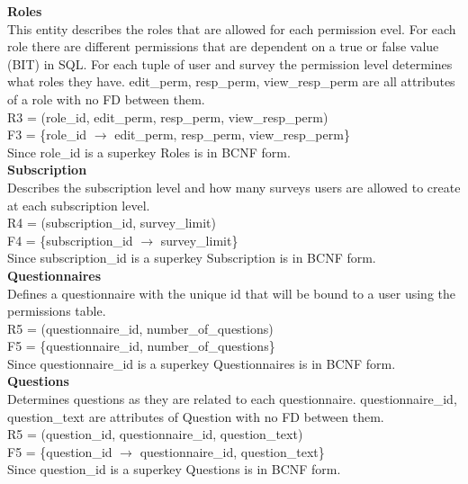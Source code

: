 \documentclass[12pt, oneside, a4paper]{article}
\newcommand{\tb}[1]{\textbf{#1}}
\begin{document}
    \tb{Roles} \\
    This entity describes the roles that are allowed for each permission evel. For each role there are different permissions that are dependent on a true or false value (BIT) in SQL. For each tuple of user and survey the permission level determines what roles they have. edit\_perm, resp\_perm, view\_resp\_perm are all attributes of a role with no FD between them. \\
    R3 = (role\_id, edit\_perm, resp\_perm, view\_resp\_perm) \\
    F3 = \{role\_id \(\rightarrow\) edit\_perm, resp\_perm, view\_resp\_perm\} \\
    Since role\_id is a superkey Roles is in BCNF form. 
    \\

    \tb{Subscription} \\
    Describes the subscription level and how many surveys users are allowed to create at each subscription level. \\
    R4 = (subscription\_id, survey\_limit) \\
    F4 = \{subscription\_id \(\rightarrow\) survey\_limit\} \\
    Since subscription\_id is a superkey Subscription is in BCNF form. 
    \\

    \tb{Questionnaires} \\
    Defines a questionnaire with the unique id that will be bound to a user using the permissions table. \\
    R5 = (questionnaire\_id, number\_of\_questions) \\
    F5 = \{questionnaire\_id, number\_of\_questions\} \\ 
    Since questionnaire\_id is a superkey Questionnaires is in BCNF form. 
    \\

    \tb{Questions} \\
    Determines questions as they are related to each questionnaire. questionnaire\_id, question\_text are attributes of Question with no FD between them. \\
    R5 = (question\_id, questionnaire\_id, question\_text) \\
    F5 = \{question\_id \(\rightarrow\) questionnaire\_id, question\_text\} \\
    Since question\_id is a superkey Questions is in BCNF form. 
    \\
\end{document}
